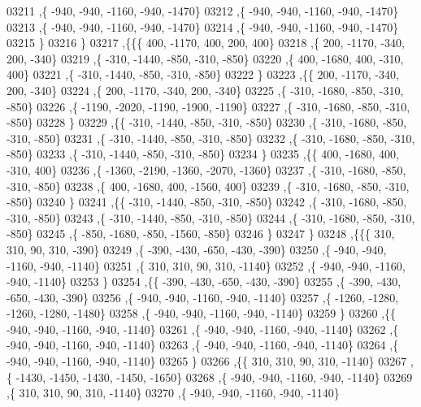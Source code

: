 \begin{DoxyCode}
03211     ,\{  -940,  -940, -1160,  -940, -1470\}
03212     ,\{  -940,  -940, -1160,  -940, -1470\}
03213     ,\{  -940,  -940, -1160,  -940, -1470\}
03214     ,\{  -940,  -940, -1160,  -940, -1470\}
03215     \}
03216    \}
03217   ,\{\{\{   400, -1170,   400,   200,   400\}
03218     ,\{   200, -1170,  -340,   200,  -340\}
03219     ,\{  -310, -1440,  -850,  -310,  -850\}
03220     ,\{   400, -1680,   400,  -310,   400\}
03221     ,\{  -310, -1440,  -850,  -310,  -850\}
03222     \}
03223    ,\{\{   200, -1170,  -340,   200,  -340\}
03224     ,\{   200, -1170,  -340,   200,  -340\}
03225     ,\{  -310, -1680,  -850,  -310,  -850\}
03226     ,\{ -1190, -2020, -1190, -1900, -1190\}
03227     ,\{  -310, -1680,  -850,  -310,  -850\}
03228     \}
03229    ,\{\{  -310, -1440,  -850,  -310,  -850\}
03230     ,\{  -310, -1680,  -850,  -310,  -850\}
03231     ,\{  -310, -1440,  -850,  -310,  -850\}
03232     ,\{  -310, -1680,  -850,  -310,  -850\}
03233     ,\{  -310, -1440,  -850,  -310,  -850\}
03234     \}
03235    ,\{\{   400, -1680,   400,  -310,   400\}
03236     ,\{ -1360, -2190, -1360, -2070, -1360\}
03237     ,\{  -310, -1680,  -850,  -310,  -850\}
03238     ,\{   400, -1680,   400, -1560,   400\}
03239     ,\{  -310, -1680,  -850,  -310,  -850\}
03240     \}
03241    ,\{\{  -310, -1440,  -850,  -310,  -850\}
03242     ,\{  -310, -1680,  -850,  -310,  -850\}
03243     ,\{  -310, -1440,  -850,  -310,  -850\}
03244     ,\{  -310, -1680,  -850,  -310,  -850\}
03245     ,\{  -850, -1680,  -850, -1560,  -850\}
03246     \}
03247    \}
03248   ,\{\{\{   310,   310,    90,   310,  -390\}
03249     ,\{  -390,  -430,  -650,  -430,  -390\}
03250     ,\{  -940,  -940, -1160,  -940, -1140\}
03251     ,\{   310,   310,    90,   310, -1140\}
03252     ,\{  -940,  -940, -1160,  -940, -1140\}
03253     \}
03254    ,\{\{  -390,  -430,  -650,  -430,  -390\}
03255     ,\{  -390,  -430,  -650,  -430,  -390\}
03256     ,\{  -940,  -940, -1160,  -940, -1140\}
03257     ,\{ -1260, -1280, -1260, -1280, -1480\}
03258     ,\{  -940,  -940, -1160,  -940, -1140\}
03259     \}
03260    ,\{\{  -940,  -940, -1160,  -940, -1140\}
03261     ,\{  -940,  -940, -1160,  -940, -1140\}
03262     ,\{  -940,  -940, -1160,  -940, -1140\}
03263     ,\{  -940,  -940, -1160,  -940, -1140\}
03264     ,\{  -940,  -940, -1160,  -940, -1140\}
03265     \}
03266    ,\{\{   310,   310,    90,   310, -1140\}
03267     ,\{ -1430, -1450, -1430, -1450, -1650\}
03268     ,\{  -940,  -940, -1160,  -940, -1140\}
03269     ,\{   310,   310,    90,   310, -1140\}
03270     ,\{  -940,  -940, -1160,  -940, -1140\}

\end{DoxyCode}
